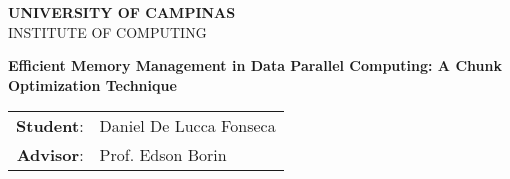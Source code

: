 \documentclass[11pt]{article}
\begin{document}


\begin{titlepage} 

    \begin{center} 
        \large \textbf{UNIVERSITY OF CAMPINAS}\\
        \large INSTITUTE OF COMPUTING\\
        
        \vspace{0.5cm}

        \begin{minipage}[tl]{31mm}
        \end{minipage}

        \vspace{0.3cm}
        \textbf{Efficient Memory Management in Data Parallel Computing: A Chunk Optimization Technique}
        \vspace{0.2cm}

        \begin{tabular}{rl}
            \textbf{Student}: & Daniel De Lucca Fonseca \\
            \textbf{Advisor}: & Prof. Edson Borin \\
        \end{tabular}

    \end{center}


\end{titlepage} 

\setlength{\baselineskip}{0.1 cm}
 \pagebreak
\normalsize \tableofcontents \pagebreak
{}

\acresetall






\begin{footnotesize}
\printbibliography
\end{footnotesize}
\end{document}

